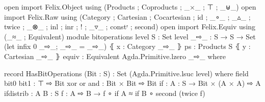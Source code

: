 


\begin{code}



open import Felix.Object using (Products ;  Coproducts ;   _×_ ; ⊤ ; _⊎_)
open import Felix.Raw using (Category ; Cartesian ; Cocartesian ; id ; _∘_ ; _▵_ ; twice ; _⊗_ ; inl ; inr ; ! ; _▿_ ; constʳ ; second)
open import Felix.Equiv using (_≈_ ; Equivalent)
module bitoperations
       {level}
       {S : Set level}
     {_⇨_ : S  → S  → Set} (let infix 0 _⇨_; _⇨_ = _⇨_)
     ⦃ x : Category _⇨_ ⦄
         {{ps : Products S}}
     ⦃ y : Cartesian _⇨_ ⦄
         {{ equiv : Equivalent Agda.Primitive.lzero _⇨_ }}
     where



record HasBitOperations (Bit : S) : Set (Agda.Primitive.lsuc level) where
  field
    bit0 bit1 : ⊤ ⇨ Bit
    xor or and : Bit × Bit  ⇨ Bit
    if : {A : S } →  Bit × (A × A) ⇨ A
    ifdistrib : {A B : S} {f : A ⇨ B } →  f ∘ if {A} ≈ if {B} ∘ second (twice f)


\end{code}
